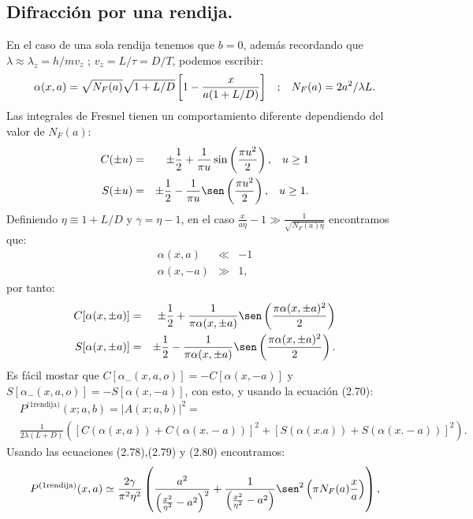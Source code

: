 \subsection{Difracción por una rendija.}
En el caso de una sola rendija tenemos que $b=0$, además recordando que $\lambda\approx\lambda_z=h/mv_z$ ; $v_z=L/\tau=D/T$, podemos escribir:
\begin{equation}
\alpha(x,a)=\sqrt{N_F(a)}\sqrt{1+L/D}\left[	1-\frac{x}{a(1+L/D)}\right] \hspace{0.3cm};\hspace{0.3cm} N_F(a)=2a^2/\lambda L .
\end{equation}
Las integrales de Fresnel tienen un comportamiento diferente dependiendo del valor de $N_F(a)$:
\begin{eqnarray}
C(\pm u)&=&\pm\frac{1}{2}+\frac{1}{\pi u}\sin\left(\frac{\pi u^2}{2}\right),\hspace{0.3cm}u\geq 1\\
S(\pm u)&=&\pm\frac{1}{2}-\frac{1}{\pi u}\sen\left(\frac{\pi u^2}{2}\right),\hspace{0.3cm}u\geq 1 .
\end{eqnarray}
Definiendo $\eta\equiv 1+L/D$ y $\gamma=\eta-1$, en el caso $\frac{x}{a\eta}-1\gg\frac{1}{\sqrt{N_F(a)\eta}}$ encontramos que:
\begin{eqnarray}
\alpha(x,a)&\ll&-1\\
\alpha(x,-a)&\gg&1 ,
\end{eqnarray} 
por tanto:
\begin{eqnarray}
C[\alpha(x,\pm a)]&=&\pm\frac{1}{2}+\frac{1}{\pi\alpha(x,\pm a) }\sen\left(\frac{\pi \alpha(x,\pm a)^2}{2}\right)\\
S[\alpha(x,\pm a)]&=&\pm\frac{1}{2}-\frac{1}{\pi\alpha(x,\pm a) }\sen\left(\frac{\pi \alpha(x,\pm a)^2}{2}\right) .
\end{eqnarray}
Es fácil mostar que $C[\alpha_-(x,a,o)]=-C[\alpha(x,-a)]$ y $S[\alpha_-(x,a,o)]=-S[\alpha(x,-a)]$, con esto, y usando la ecuación (2.70):
\begin{eqnarray}
\nonumber & P^{\text{(1rendija)}}(x;a,b)=|A(x;a,b)|^2=\\&\frac{1}{2\lambda(L+D)}
([C(\alpha(x,a))+C(\alpha(x.-a))]^{2}+[S(\alpha(x.a))+S(\alpha(x.-a))]^{2}) .
\end{eqnarray}
Usando las ecuaciones (2.78),(2.79) y (2.80) encontramos:
\begin{equation}
P^{(\text{1rendija})}(x,a)\simeq\frac{2\gamma}{\pi^{2}\eta^{2}}\left(\frac{a^{2}}{\left(\frac{x^{2}}{\eta^{2}}-a^{2}\right)^{2}}+\frac{1}{\left(\frac{x^{2}}{\eta^{2}}-a^{2}\right)}\sen^{2}\left(\pi N_{F}(a)\frac{x}{a}\right)\right) ,
\end{equation}
